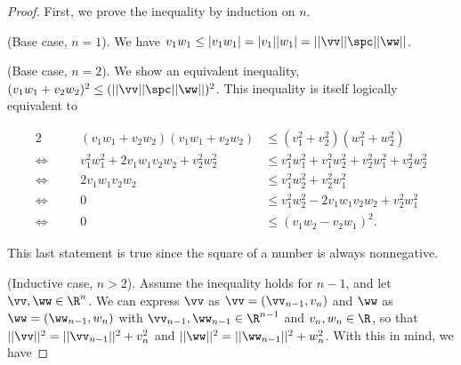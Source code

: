 \begin{proof}
	
	First, we prove the inequality by induction on $n$.
	
	\fullindent
	{
		(Base case, $n = 1$). We have $v_1 w_1 \leq |v_1 w_1| = |v_1||w_1| = ||\vv|| \spc ||\ww||$.
		
		(Base case, $n = 2$). We show an equivalent inequality, $(v_1 w_1 + v_2 w_2)^2 \leq (||\vv|| \spc ||\ww||)^2$. This inequality is itself logically equivalent to 
		
		\begin{alignat*}{2}
			& & (v_1 w_1 + v_2 w_2)(v_1 w_1 + v_2 w_2) &{}\leq{} (v_1^2 + v_2^2)(w_1^2 + w_2^2) \\
			\iff\quad & & v_1^2 w_1^2 + 2 v_1 w_1 v_2 w_2 + v_2^2 w_2^2 &{}\leq{} v_1^2 w_1^2 + v_1^2 w_2^2 + v_2^2 w_1^2 + v_2^2 w_2^2 \\
			\iff\quad & & 2 v_1 w_1 v_2 w_2 &{}\leq{} v_1^2 w_2^2 + v_2^2 w_1^2 \\
			\iff\quad & & 0 &{}\leq{} v_1^2 w_2^2 - 2 v_1 w_1 v_2 w_2 + v_2^2 w_1^2 \\
			\iff\quad & & 0 &{}\leq{} (v_1 w_2 - v_2 w_1)^2.
		\end{alignat*}
		
		This last statement is true since the square of a number is always nonnegative.
		
		(Inductive case, $n > 2$). Assume the inequality holds for $n - 1$, and let $\vv, \ww \in \R^n$. We can express $\vv$ as $\vv = (\vv_{n - 1}, v_n)$ and $\ww$ as $\ww = (\ww_{n - 1}, w_n)$ with $\vv_{n - 1}, \ww_{n - 1} \in \R^{n - 1}$ and $v_n, w_n \in \R$, so that $||\vv||^2 = ||\vv_{n - 1}||^2 + v_n^2$ and $||\ww||^2 = ||\ww_{n - 1}||^2 + w_n^2$. With this in mind, we have
		
}
\end{proof}
